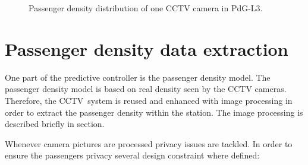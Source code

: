 \begin{figure}[htbp]

  \centering

  \hfill

  \caption{Passenger density distribution of one CCTV camera in PdG-L3.}
  \label{fig:PdG-L3_CCTVcameras}

\end{figure}


\section{Passenger density data extraction}
\label{sec:PassengerDensityDataExtraction}

One part of the predictive controller is the passenger density model. The passenger density model is based on real density seen by the CCTV cameras. Therefore, the CCTV~system is reused and enhanced with image processing in order to extract the passenger density within the station. The image processing is described briefly in section.

Whenever camera pictures are processed privacy issues are tackled. In order to ensure the passengers privacy several design constraint where defined:

